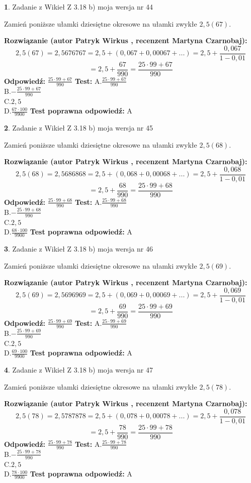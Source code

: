 \documentclass[12pt, a4paper]{article}
\theoremstyle{definition} %
\newtheorem{zad}{}
\newcommand{\zadStart}[1]{\begin{zad}#1\newline}
\newcommand{\zadStop}{\end{zad}}
\newcommand{\rozwStart}[2]{\noindent \textbf{Rozwiązanie (autor #1 , recenzent #2): }\newline}
\newcommand{\rozwStop}{\newline}
\newcommand{\odpStart}{\noindent \textbf{Odpowiedź:}\newline}
\newcommand{\odpStop}{\newline}
\newcommand{\testStart}{\noindent \textbf{Test:}\newline}
\newcommand{\testStop}{\newline}
\newcommand{\kluczStart}{\noindent \textbf{Test poprawna odpowiedź:}\newline}
\newcommand{\kluczStop}{\newline}
\begin{document}
\zadStart{Zadanie z Wikieł Z 3.18 b) moja wersja nr 44}

Zamień poniższe ułamki dziesiętne okresowe na ułamki zwykłe $2,5(67)$.
\zadStop
\rozwStart{Patryk Wirkus}{Martyna Czarnobaj}
$$2,5(67)=2,5676767=2,5+(0,067+0,00067+...)=2,5+\frac{0,067}{1-0,01}$$
$$=2,5+\frac{67}{990}=\frac{25\cdot99+67}{990}$$
\rozwStop
\odpStart
$\frac{25\cdot99+67}{990}$
\odpStop
\testStart
A.$\frac{25\cdot99+67}{990}$\\ B.$-\frac{25\cdot99+67}{990}$\\ C.$2,5$\\ D.$\frac{67\cdot100}{9900}$
\testStop
\kluczStart
A
\kluczStop



\zadStart{Zadanie z Wikieł Z 3.18 b) moja wersja nr 45}

Zamień poniższe ułamki dziesiętne okresowe na ułamki zwykłe $2,5(68)$.
\zadStop
\rozwStart{Patryk Wirkus}{Martyna Czarnobaj}
$$2,5(68)=2,5686868=2,5+(0,068+0,00068+...)=2,5+\frac{0,068}{1-0,01}$$
$$=2,5+\frac{68}{990}=\frac{25\cdot99+68}{990}$$
\rozwStop
\odpStart
$\frac{25\cdot99+68}{990}$
\odpStop
\testStart
A.$\frac{25\cdot99+68}{990}$\\ B.$-\frac{25\cdot99+68}{990}$\\ C.$2,5$\\ D.$\frac{68\cdot100}{9900}$
\testStop
\kluczStart
A
\kluczStop



\zadStart{Zadanie z Wikieł Z 3.18 b) moja wersja nr 46}

Zamień poniższe ułamki dziesiętne okresowe na ułamki zwykłe $2,5(69)$.
\zadStop
\rozwStart{Patryk Wirkus}{Martyna Czarnobaj}
$$2,5(69)=2,5696969=2,5+(0,069+0,00069+...)=2,5+\frac{0,069}{1-0,01}$$
$$=2,5+\frac{69}{990}=\frac{25\cdot99+69}{990}$$
\rozwStop
\odpStart
$\frac{25\cdot99+69}{990}$
\odpStop
\testStart
A.$\frac{25\cdot99+69}{990}$\\ B.$-\frac{25\cdot99+69}{990}$\\ C.$2,5$\\ D.$\frac{69\cdot100}{9900}$
\testStop
\kluczStart
A
\kluczStop



\zadStart{Zadanie z Wikieł Z 3.18 b) moja wersja nr 47}

Zamień poniższe ułamki dziesiętne okresowe na ułamki zwykłe $2,5(78)$.
\zadStop
\rozwStart{Patryk Wirkus}{Martyna Czarnobaj}
$$2,5(78)=2,5787878=2,5+(0,078+0,00078+...)=2,5+\frac{0,078}{1-0,01}$$
$$=2,5+\frac{78}{990}=\frac{25\cdot99+78}{990}$$
\rozwStop
\odpStart
$\frac{25\cdot99+78}{990}$
\odpStop
\testStart
A.$\frac{25\cdot99+78}{990}$\\ B.$-\frac{25\cdot99+78}{990}$\\ C.$2,5$\\ D.$\frac{78\cdot100}{9900}$
\testStop
\kluczStart
A
\kluczStop
\end{document}
